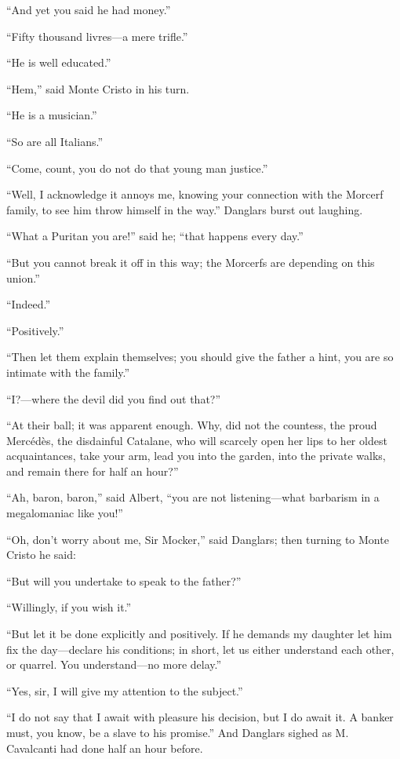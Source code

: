 “And yet you said he had money.”

“Fifty thousand livres—a mere trifle.”

“He is well educated.”

“Hem,” said Monte Cristo in his turn.

“He is a musician.”

“So are all Italians.”

“Come, count, you do not do that young man justice.”

“Well, I acknowledge it annoys me, knowing your connection with the
Morcerf family, to see him throw himself in the way.” Danglars burst
out laughing.

“What a Puritan you are!” said he; “that happens every day.”

“But you cannot break it off in this way; the Morcerfs are depending on
this union.”

“Indeed.”

“Positively.”

“Then let them explain themselves; you should give the father a hint,
you are so intimate with the family.”

“I?—where the devil did you find out that?”

“At their ball; it was apparent enough. Why, did not the countess, the
proud Mercédès, the disdainful Catalane, who will scarcely open her
lips to her oldest acquaintances, take your arm, lead you into the
garden, into the private walks, and remain there for half an hour?”

“Ah, baron, baron,” said Albert, “you are not listening—what barbarism
in a megalomaniac like you!”

“Oh, don’t worry about me, Sir Mocker,” said Danglars; then turning to
Monte Cristo he said:

“But will you undertake to speak to the father?”

“Willingly, if you wish it.”

“But let it be done explicitly and positively. If he demands my
daughter let him fix the day—declare his conditions; in short, let us
either understand each other, or quarrel. You understand—no more
delay.”

“Yes, sir, I will give my attention to the subject.”

“I do not say that I await with pleasure his decision, but I do await
it. A banker must, you know, be a slave to his promise.” And Danglars
sighed as M. Cavalcanti had done half an hour before.

